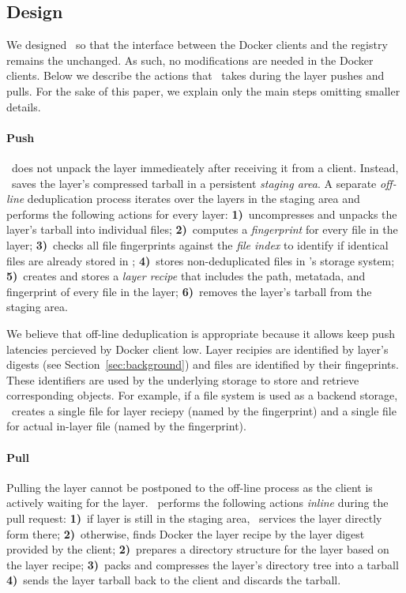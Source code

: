 \subsection{Design}
\label{sec:design}

We designed \sysname\ so that the interface between the Docker clients and the
registry remains the unchanged.
%
As such, no modifications are needed in the Docker clients.
%
Below we describe the actions that \sysname\ takes during the layer pushes and
pulls.
%
For the sake of this paper, we explain only the main steps omitting smaller
details.

\paragraph{Push}
%
\sysname\ does not unpack the layer immedieately after receiving it from a
client.
%
Instead, \sysname\ saves the layer's compressed tarball in a persistent
\emph{staging area}.
%
A separate \emph{off-line} deduplication process iterates over the layers in
the staging area and performs the following actions for every layer:
%
\textbf{1)}~uncompresses and unpacks the layer's tarball into individual files;
%
\textbf{2)}~computes a \emph{fingerprint} for every file in the layer;
%
\textbf{3)}~checks all file fingerprints against the \emph{file index} to
identify if identical files are already stored in \sysname;
%
\textbf{4)}~stores non-deduplicated files in \sysname's storage system;
%
\textbf{5)}~creates and stores a \emph{layer recipe} that includes the path,
metatada, and fingerprint of every file in the layer;
%
\textbf{6)}~removes the layer's tarball from the staging area.

We believe that off-line deduplication is appropriate because it allows
keep push latencies percieved by  Docker client low.
%
Layer recipies are identified by layer's digests (see
Section~\ref{sec:background}) and files are identified by their fingeprints.
%
These identifiers are used by the underlying storage to store and retrieve
corresponding objects.
%
For example, if a file system is used as a backend storage, \sysname\ creates a
single file for layer reciepy (named by the fingerprint) and a single file for
actual in-layer file (named by the fingerprint).


\paragraph{Pull}
%
Pulling the layer cannot be postponed to the off-line process as the client is
actively waiting for the layer. 
%
\sysname\ performs the following actions \emph{inline} during the pull request:
%
\textbf{1)}~if layer is still in the staging area, \sysname\ services the layer
directly form there;
%
\textbf{2)}~otherwise, \sysname finds Docker the layer recipe by the layer
digest provided by the client;
%
\textbf{2)}~prepares a directory structure for the layer based on the layer
recipe;
%
\textbf{3)}~packs and compresses the layer's  directory tree into a tarball
%
\textbf{4)}~sends the layer tarball back to the client and discards the tarball.

